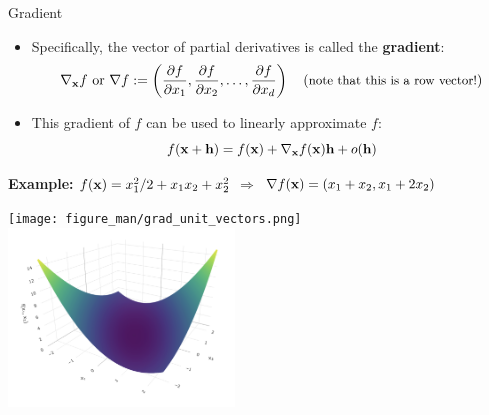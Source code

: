 \documentclass[11pt,compress,t,notes=noshow, xcolor=table]{beamer}
\begin{document}
\begin{vbframe}{Gradient}

\begin{itemize}
    \item Specifically, the vector of partial derivatives is called the \textbf{gradient}:
        \begin{equation*}
        \nabla_{\mathbf{x}} f \text{ or }   \nabla f := 
            \left(\frac{\partial f}{\partial x_1}, \frac{\partial f}{\partial x_2}, \ldots, \frac{\partial f}{\partial x_d}\right)\quad\text{({\small note that this is a row vector!})}
        \end{equation*}
    \item This gradient of $f$ can be used to linearly approximate $f$:
    $$
    f(\mathbf{x}+\mathbf{h})=f(\mathbf{x})+\nabla_{\mathbf{x}}f(\mathbf{x}) \mathbf{h}+o(\mathbf{h})
    $$
\end{itemize}

\vspace{0.5\baselineskip}

\textbf{Example:} $f(\mathbf{x}) = x_1^2/2 + x_1 x_2 + x_2^2$ $\Rightarrow$ $\nabla f(\mathbf{x}) = (x_1 + x_2, x_1 + 2x_2)$

\vspace{-0.5\baselineskip}

\begin{center}
	\texttt{[image: figure\_man/grad\_unit\_vectors.png]} ~~~ \includegraphics[width=0.45\textwidth]{figure_man/gradient2.png}
\end{center}

\end{vbframe}
\end{document}
